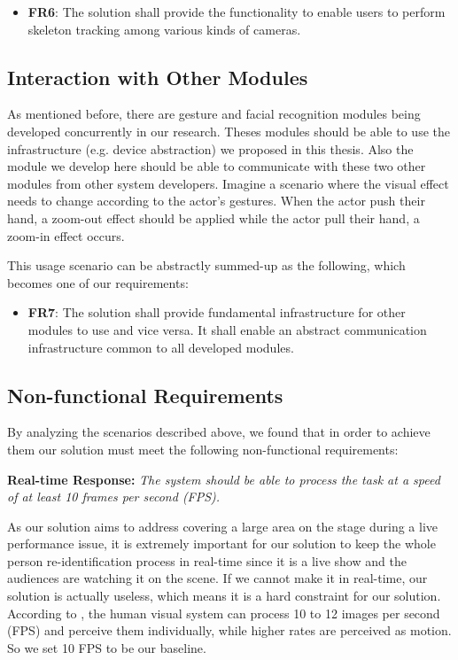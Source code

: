 \begin{itemize}
    \item \textbf{FR6}: The solution shall provide the functionality to enable
    users to perform skeleton tracking among various kinds of cameras.
\end{itemize}

\subsection{Interaction with Other Modules}
\label{sec:intro-sq-inta}

As mentioned before, there are gesture and facial recognition modules being
developed concurrently in our research. Theses modules should be able to use
the infrastructure (e.g. device abstraction) we proposed in this thesis. Also
the module we develop here should be able to communicate with these two other
modules from other system developers. Imagine a scenario where the visual
effect needs to change according to the actor's gestures. When the actor push
their hand, a zoom-out effect should be applied while the actor pull their
hand, a zoom-in effect occurs.

This usage scenario can be abstractly summed-up as the following, which becomes
one of our requirements:

\begin{itemize}
    \item \textbf{FR7}: The solution shall provide fundamental infrastructure
    for other modules to use and vice versa. It shall enable an abstract 
    communication infrastructure common to all developed modules.
\end{itemize}

\subsection{Non-functional Requirements}
\label{sec:intro-non-func-req}

By analyzing the scenarios described above, we found that in order to
achieve them our solution must meet the following non-functional requirements:

\textbf{Real-time Response:} 
\textit{The system should be able to process the task at a speed of at least 
10 frames per second (FPS).}

As our solution aims to address covering a large area on the stage 
during a live performance issue, it is extremely important for our solution to 
keep the whole person re-identification process in real-time since it is a live 
show and the audiences are watching it on the scene. If we cannot make it in 
real-time, our solution is actually useless, which means it is a hard 
constraint for our solution. 
According to \cite{wikipedia-frame-rate}, the human visual system 
can process 10 to 12 images per second (FPS) and perceive them 
individually, while higher rates are perceived as motion. So we set 10 FPS 
to be our baseline.

